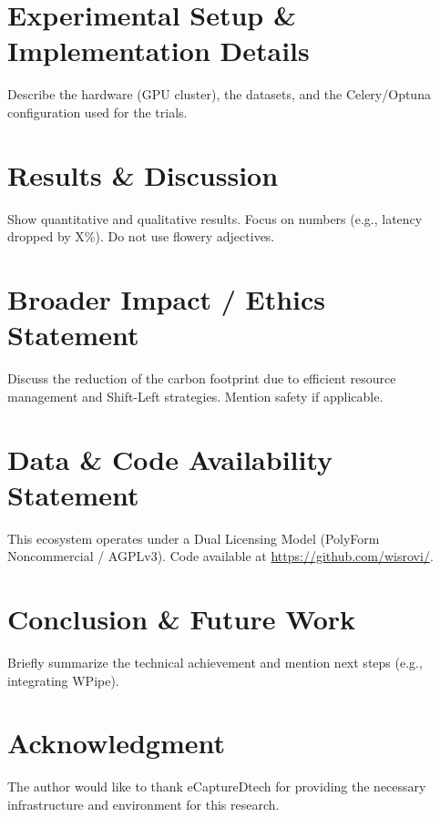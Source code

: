 \documentclass[conference]{IEEEtran}
\begin{document}
\section{Experimental Setup \& Implementation Details}
Describe the hardware (GPU cluster), the datasets, and the Celery/Optuna configuration used for the trials.

\section{Results \& Discussion}
Show quantitative and qualitative results. Focus on numbers (e.g., latency dropped by X\%). Do not use flowery adjectives.

\section{Broader Impact / Ethics Statement}
Discuss the reduction of the carbon footprint due to efficient resource management and Shift-Left strategies. Mention safety if applicable.

\section{Data \& Code Availability Statement}
This ecosystem operates under a Dual Licensing Model (PolyForm Noncommercial / AGPLv3). 
Code available at \url{https://github.com/wisrovi/}.

\section{Conclusion \& Future Work}
Briefly summarize the technical achievement and mention next steps (e.g., integrating WPipe).

\section*{Acknowledgment}
The author would like to thank eCaptureDtech for providing the necessary infrastructure and environment for this research.




\end{document}
